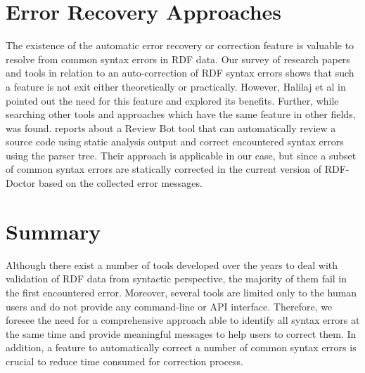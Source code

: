 \section{Error Recovery Approaches}
The existence of the automatic error recovery or correction feature is valuable to resolve from common syntax errors in RDF data.  Our survey of research papers and tools in relation to an auto-correction of RDF syntax errors shows that such a feature is not exit either theoretically or practically. %
However, Halilaj et al in \cite{Git4Voc:article} pointed out the need for this feature and explored its benefits.
Further, while searching other tools and approaches which have the same feature in other fields, \cite{AutoCorrection:Fix-it} was found.  \cite{AutoCorrection:Fix-it} reports about a Review Bot tool that can automatically review a source code using static analysis output and correct encountered syntax errors using the parser tree. Their approach is applicable in our case, but since a subset of common syntax errors are statically corrected in the current version of RDF-Doctor based on the collected error messages.    

\section{Summary}

Although there exist a number of tools developed over the years to deal with validation of RDF data from syntactic perspective, the majority of them fail in the first encountered error.
Moreover, several tools are limited only to the human users and do not provide any command-line or API interface.
Therefore, we foresee the need for a comprehensive approach able to identify all syntax errors at the same time and provide meaningful messages to help users to correct them.
In addition, a feature to automatically correct a number of common syntax errors is crucial to reduce time consumed for correction process.  











